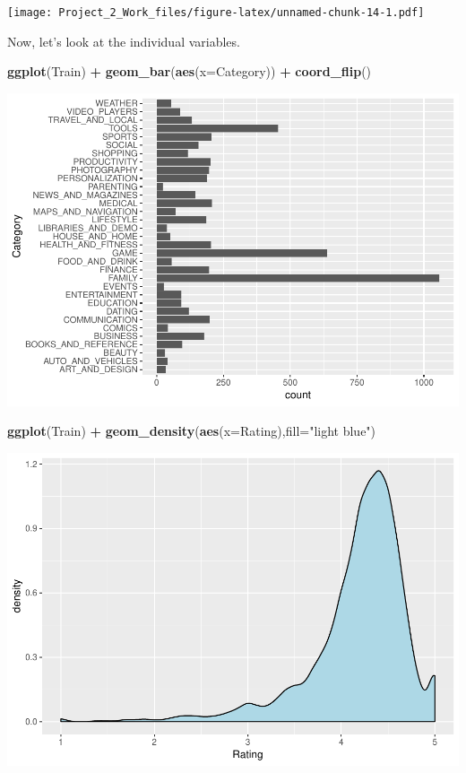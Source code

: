 \documentclass[]{article}
\newenvironment{Shaded}{\begin{snugshade}}{\end{snugshade}}
\newcommand{\DataTypeTok}[1]{\textcolor[rgb]{0.13,0.29,0.53}{#1}}
\newcommand{\KeywordTok}[1]{\textcolor[rgb]{0.13,0.29,0.53}{\textbf{#1}}}
\newcommand{\NormalTok}[1]{#1}
\newcommand{\OperatorTok}[1]{\textcolor[rgb]{0.81,0.36,0.00}{\textbf{#1}}}
\newcommand{\StringTok}[1]{\textcolor[rgb]{0.31,0.60,0.02}{#1}}
\begin{document}
\texttt{[image: Project\_2\_Work\_files/figure-latex/unnamed-chunk-14-1.pdf]}

Now, let's look at the individual variables.

\begin{Shaded}
\begin{Highlighting}[]
\KeywordTok{ggplot}\NormalTok{(Train) }\OperatorTok{+}\StringTok{ }\KeywordTok{geom_bar}\NormalTok{(}\KeywordTok{aes}\NormalTok{(}\DataTypeTok{x=}\NormalTok{Category)) }\OperatorTok{+}\StringTok{ }\KeywordTok{coord_flip}\NormalTok{()}
\end{Highlighting}
\end{Shaded}

\includegraphics{Project_2_Work_files/figure-latex/unnamed-chunk-15-1.pdf}

\begin{Shaded}
\begin{Highlighting}[]
\KeywordTok{ggplot}\NormalTok{(Train) }\OperatorTok{+}\StringTok{ }\KeywordTok{geom_density}\NormalTok{(}\KeywordTok{aes}\NormalTok{(}\DataTypeTok{x=}\NormalTok{Rating),}\DataTypeTok{fill=}\StringTok{"light blue"}\NormalTok{)}
\end{Highlighting}
\end{Shaded}

\includegraphics{Project_2_Work_files/figure-latex/unnamed-chunk-15-2.pdf}
\end{document}

